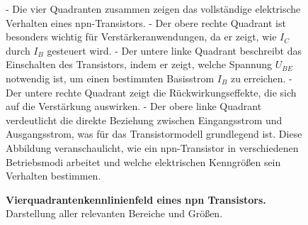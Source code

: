 {\begin{figure}[H]
{            - Die vier Quadranten zusammen zeigen das vollständige elektrische Verhalten eines npn-Transistors.
            - Der obere rechte Quadrant ist besonders wichtig für Verstärkeranwendungen, da er zeigt, wie \( I_C \) durch \( I_B \) gesteuert wird.
            - Der untere linke Quadrant beschreibt das Einschalten des Transistors, indem er zeigt, welche Spannung \( U_{BE} \) notwendig ist, um einen bestimmten Basisstrom \( I_B \) zu erreichen.
            - Der untere rechte Quadrant zeigt die Rückwirkungseffekte, die sich auf die Verstärkung auswirken.
            - Der obere linke Quadrant verdeutlicht die direkte Beziehung zwischen Eingangsstrom und Ausgangsstrom, was für das Transistormodell grundlegend ist.
            Diese Abbildung veranschaulicht, wie ein npn-Transistor in verschiedenen Betriebsmodi arbeitet und welche elektrischen Kenngrößen sein Verhalten bestimmen.}
        \caption{\textbf{Vierquadrantenkennlinienfeld eines npn Transistors.} Darstellung aller relevanten Bereiche und Größen.}
        \label{fig:Vierquadranten-KennlinienfeldEinesNpnTransistors}
    \end{figure}
}


